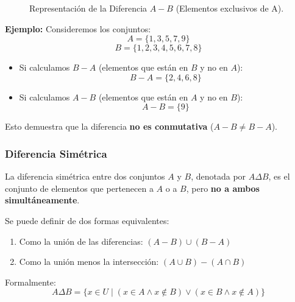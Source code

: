 \begin{figure}[ht]
\centering
{}
\caption{Representación de la Diferencia $A - B$ (Elementos exclusivos de A).}\label{fig:diferencia}
\end{figure}

\noindent \textbf{Ejemplo:}
Consideremos los conjuntos:
\[ A=\{1,3,5,7,9\} \]
\[ B=\{1,2,3,4,5,6,7,8\} \]

\begin{itemize}
    \item Si calculamos $B - A$ (elementos que están en $B$ y no en $A$):
    \[ B - A = \{2, 4, 6, 8\} \]
    \item Si calculamos $A - B$ (elementos que están en $A$ y no en $B$):
    \[ A - B = \{9\} \]
\end{itemize}
Esto demuestra que la diferencia \textbf{no es conmutativa} ($A - B \neq B - A$).

\vspace{0.5cm}

\subsubsection{Diferencia Simétrica}

La diferencia simétrica entre dos conjuntos $A$ y $B$, denotada por $A \Delta B$, es el conjunto de elementos que pertenecen a $A$ o a $B$, pero \textbf{no a ambos simultáneamente}.

Se puede definir de dos formas equivalentes:
\begin{enumerate}
\item Como la unión de las diferencias: $(A - B) \cup (B - A)$
\item  Como la unión menos la intersección: $(A \cup B) - (A \cap B)$
\end{enumerate}
Formalmente:
\[ A \Delta B = \{ x \in U \mid (x \in A \land x \notin B) \lor (x \in B \land x \notin A) \} \]

